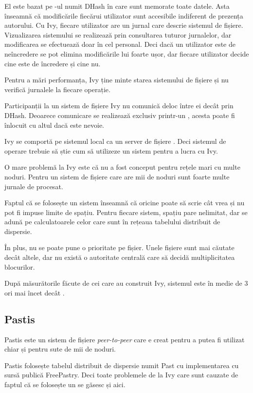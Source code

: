 \documentclass[a4wide,12pt]{report}
\newcommand{\eng}[1]{\emph{#1}} %
\newcommand{\acr}[1]{{\textsmaller[1]{\textsc{#1}}}} %
\begin{document}
El este bazat pe \acr{TDD}-ul numit DHash în care sunt memorate toate datele. Asta înseamnă că modificările fiecărui
utilizator sunt accesibile indiferent de prezența autorului. Cu Ivy, fiecare utilizator are un jurnal care descrie
sistemul de fișiere. Vizualizarea sistemului se realizează prin consultarea tuturor jurnalelor, dar modificarea se
efectuează doar în cel personal. Deci dacă un utilizator este de neîncredere se pot elimina modificările lui foarte
ușor, dar fiecare utilizator decide cine este de încredere și cine nu.

Pentru a mări performanța, Ivy ține minte starea sistemului de fișiere și nu verifică jurnalele la fiecare operație.

Participanții la un sistem de fișiere Ivy nu comunică deloc între ei decât prin DHash. Deoarece comunicare se
realizează exclusiv printr-un \acr{TDD}, acesta poate fi înlocuit cu altul dacă este nevoie.

Ivy se comportă pe sistemul local ca un server de fișiere \acr{NFS}. Deci sistemul de operare trebuie să știe cum să
utilizeze un sistem \acr{NFS} pentru a lucra cu Ivy.

O mare problemă la Ivy este că nu a fost conceput pentru rețele mari cu multe noduri. Pentru un sistem de fișiere care
are mii de noduri sunt foarte multe jurnale de procesat.

Faptul că se folosește un sistem \acr{TDD} înseamnă că oricine poate să scrie cât vrea și nu pot fi impuse limite de
spațiu. Pentru fiecare sistem, spațiu pare nelimitat, dar se adună pe calculatoarele celor care sunt în rețeaua
tabelului distribuit de dispersie.

În plus, nu se poate pune o prioritate pe fișier. Unele fișiere sunt mai căutate decât altele, dar nu există o
autoritate centrală care să decidă multiplicitatea blocurilor.

După măsurătorile făcute de cei care au construit Ivy, sistemul este în medie de 3 ori mai încet decât \acr{NFS}.

\subsection{Pastis} %

Pastis este un sistem de fișiere \eng{peer-to-peer} care e creat pentru a putea fi utilizat chiar și pentru sute
de mii de noduri\cite{lucpastis}.

Pastis folosește tabelul distribuit de dispersie numit Past cu implementarea cu sursă publică FreePastry. Deci toate
problemele de la Ivy care sunt cauzate de faptul că se folosește un \acr{TDD} se găsesc și aici.
\end{document}
